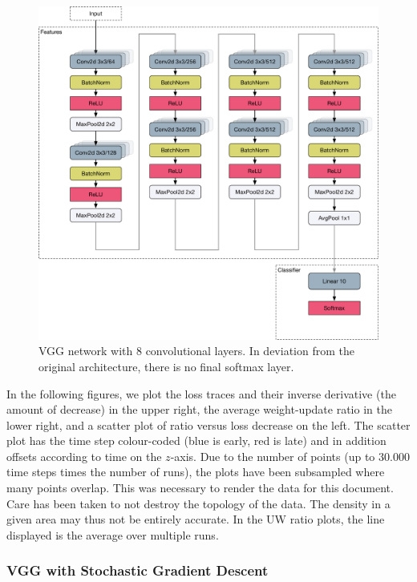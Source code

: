 \begin{figure}
    \centering
    \includegraphics[width=\linewidth]{gfx/diagrams/neural_network/vgg.pdf}
    \caption[VGG network with $8$ convolutionsl layers.]{VGG network with $8$ convolutional layers. In
    deviation from the original architecture, there is no final softmax layer.}
    \label{fig:vgg16}
\end{figure}

In the following figures, we plot the loss traces and their inverse derivative
(the amount of decrease) in the upper right, the average weight-update ratio in
the lower right, and a scatter plot of ratio versus loss decrease on the left.
The scatter plot has the time step colour-coded (blue is early, red is late) and
in addition offsets according to time on the $z$-axis. Due to the number of
points (up to $30.000$ time steps times the number of runs), the plots have been
subsampled where many points overlap. This was necessary to render the data for
this document. Care has been taken to not destroy the topology of the data.  The
density in a given area may thus not be entirely accurate. In the UW ratio
plots, the line displayed is the average over multiple runs.

\subsubsection{VGG with Stochastic Gradient Descent}


